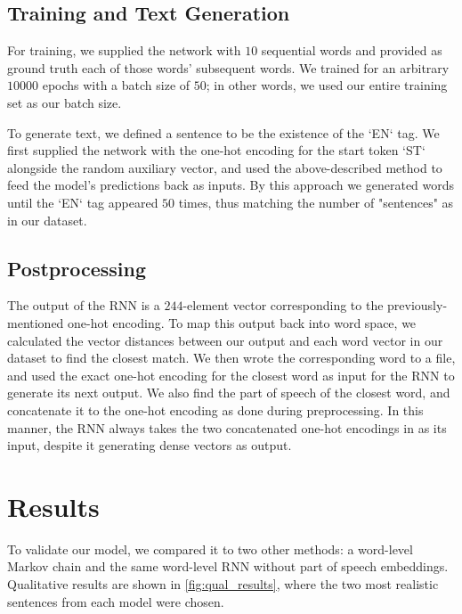 \documentclass[conference]{IEEEtran}
\begin{document}
\subsection{Training and Text Generation}

For training, we supplied the network with $10$ sequential words and provided as ground truth each of those words' subsequent words.  We trained for an arbitrary $10 000$ epochs with a batch size of $50$; in other words, we used our entire training set as our batch size.

To generate text, we defined a sentence to be the existence of the `EN` tag.  We first supplied the network with the one-hot encoding for the start token `ST` alongside the random auxiliary vector, and used the above-described method to feed the model's predictions back as inputs.  By this approach we generated words until the `EN` tag appeared $50$ times, thus matching the number of "sentences" as in our dataset.


\subsection{Postprocessing}

The output of the RNN is a $244$-element vector corresponding to the previously-mentioned one-hot encoding.  To map this output back into word space, we calculated the vector distances between our output and each word vector in our dataset to find the closest match.  We then wrote the corresponding word to a file, and used the exact one-hot encoding for the closest word as input for the RNN to generate its next output.  We also find the part of speech of the closest word, and concatenate it to the one-hot encoding as done during preprocessing. In this manner, the RNN always takes the two concatenated one-hot encodings in as its input, despite it generating dense vectors as output.

\section{Results}
To validate our model, we compared it to two other methods: a word-level Markov chain and the same word-level RNN without part of speech embeddings.  Qualitative results are shown in \ref{fig:qual_results}, where the two most realistic sentences from each model were chosen.
\end{document}
